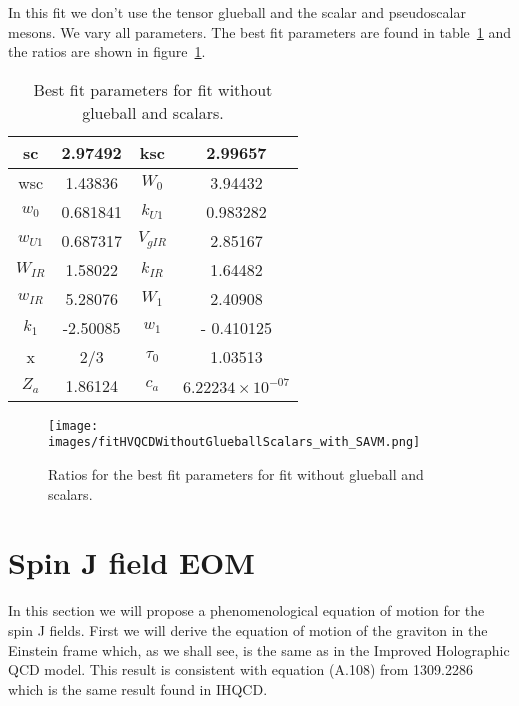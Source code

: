 \documentclass[a4paper,12pt]{article}
\begin{document}
In this fit we don't use the tensor glueball and the scalar and pseudoscalar mesons. We vary all parameters. The best fit parameters are found in table~\ref{table: fit without glueball scalars} and the ratios are shown in figure~\ref{figure: fit without glueball scalars}.

\begin{table}
\centering
\begin{tabular}{ | c | c | c | c |}
\hline
sc & 2.97492 & ksc & 2.99657 \\
\hline
wsc & 1.43836 & $W_0$ & 3.94432 \\
\hline
$w_0$ & 0.681841 & $k_{U1}$ & 0.983282  \\
\hline
$w_{U1}$ & 0.687317 & $V_{gIR}$ & 2.85167 \\
\hline
$W_{IR}$ & 1.58022 & $k_{IR}$ & 1.64482 \\
\hline
$w_{IR}$ & 5.28076 & $W_1$ & 2.40908 \\
\hline
$k_1$ & -2.50085 & $w_1$ & - 0.410125 \\
\hline
x & 2/3 & $\tau_0$ & 1.03513 \\
\hline
$Z_a$ & 1.86124 & $c_a$ & $6.22234 \times 10^{-07}$ \\
\hline
\end{tabular}
\caption{Best fit parameters for fit without glueball and scalars.}
\label{table: fit without glueball scalars} 
\end{table}



\begin{figure}
  \center
  \texttt{[image: images/fitHVQCDWithoutGlueballScalars\_with\_SAVM.png]} 
  \caption{Ratios for the best fit parameters for fit without glueball and scalars.}
   \label{figure: fit without glueball scalars}
\end{figure}


\section{Spin J field EOM}

In this section we will propose a phenomenological equation of motion for the spin J fields. First we will derive the equation of motion of the graviton in the Einstein frame which, as we shall see, is the same as in the Improved Holographic QCD model. This result is consistent with equation (A.108) from 1309.2286 which is the same result found in IHQCD.
\end{document}
